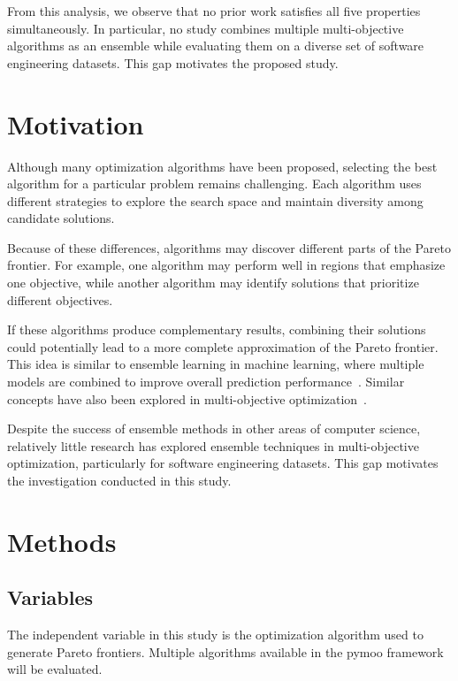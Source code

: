 \documentclass[sigconf,authorversion,nonacm]{acmart}
\begin{document}
From this analysis, we observe that no prior work satisfies all five 
properties simultaneously. In particular, no study combines multiple 
multi-objective algorithms as an ensemble while evaluating them on a 
diverse set of software engineering datasets. This gap motivates the 
proposed study.

\section{Motivation}

Although many optimization algorithms have been proposed, selecting the 
best algorithm for a particular problem remains challenging. Each 
algorithm uses different strategies to explore the search space and 
maintain diversity among candidate solutions.

Because of these differences, algorithms may discover different parts 
of the Pareto frontier. For example, one algorithm may perform well in 
regions that emphasize one objective, while another algorithm may 
identify solutions that prioritize different objectives.

If these algorithms produce complementary results, combining their 
solutions could potentially lead to a more complete approximation of 
the Pareto frontier. This idea is similar to ensemble learning in machine learning, where multiple 
models are combined to improve overall prediction performance~\cite{dietterich2000ensemble}. 
Similar concepts have also been explored in multi-objective optimization~\cite{chandra2006ensemble}.

Despite the success of ensemble methods in other areas of computer 
science, relatively little research has explored ensemble techniques 
in multi-objective optimization, particularly for software engineering 
datasets. This gap motivates the investigation conducted in this study.

\section{Methods}

\subsection{Variables}

The independent variable in this study is the optimization algorithm 
used to generate Pareto frontiers. Multiple algorithms available in 
the pymoo framework will be evaluated.
\end{document}
